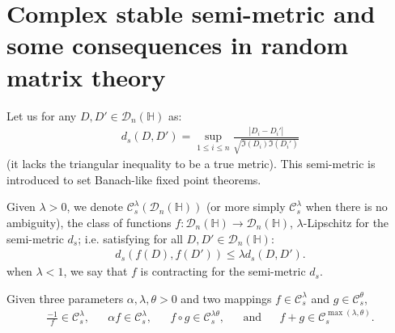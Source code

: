 \documentclass[a4papaer, titlepage]{book}
\begin{document}
\section{Complex stable semi-metric and some consequences in random matrix theory}\label{sec:stable_metric_complex}
Let us for any $D, D' \in \mathcal D_n(\mathbb H)$ as:
\begin{align*}
  d_s(D,D') = \sup_{1\leq i \leq n} \frac{|D_i- D_i'|}{\sqrt{\Im(D_i) \Im(D_i')}}
\end{align*}
(it lacks the triangular inequality to be a true metric). This semi-metric is introduced to set Banach-like fixed point theorems.%
\begin{definition}\label{def:stable_class}
  Given $\lambda>0$, we denote $\mathcal C_s^\lambda(\mathcal D_n(\mathbb H))$ (or more simply $\mathcal C_s^\lambda$ when there is no ambiguity), the class of functions $f: \mathcal D_n(\mathbb H) \to \mathcal D_n(\mathbb H)$, $\lambda$-Lipschitz for the semi-metric $d_s$; i.e. satisfying for all $D, D' \in \mathcal D_n(\mathbb H)$:
\begin{align*}
  d_s(f(D),f(D')) \leq \lambda d_s(D,D').
\end{align*}
when $\lambda <1$, we say that $f$ is contracting for the semi-metric $d_s$.
\end{definition}
\begin{proposition}\label{pro:stability_propertis}
  Given three parameters $\alpha,\lambda, \theta>0$ and two mappings $f \in \mathcal C_s^\lambda$ and $g \in \mathcal C_s^\theta$,%
  \begin{align*}
    \frac{-1}{f} \in \mathcal C_s^\lambda ,&%
    &\alpha f\in \mathcal C_s^\lambda,&%
    &f\circ g\in \mathcal C_s^{\lambda \theta},&
    &\text{and}&
    &f + g \in \mathcal C_s^{\max(\lambda,\theta)}.%
  \end{align*}
\end{proposition}
\end{document}
